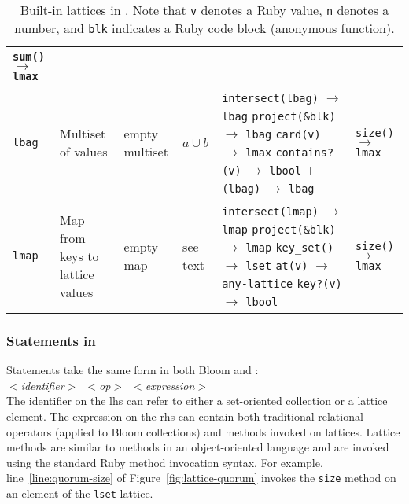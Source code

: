 \begin{table*}[t]
\begin{center}
\begin{tabular}{|l|p{0.88in}|l|l|p{1.44in}|p{1.00in}|}
\texttt{sum()} $\to$ \texttt{lmax} \\
\hline
\texttt{lbag} & Multiset of values & empty multiset & $a \cup b$ &
\texttt{intersect(lbag)} $\to$ \texttt{lbag}\newline
\texttt{project(\&blk)} $\to$ \texttt{lbag}\newline
\texttt{card(v)} $\to$ \texttt{lmax}\newline
\texttt{contains?(v)} $\to$ \texttt{lbool}\newline
\texttt{$\mathtt{+}$(lbag)} $\to$ \texttt{lbag}
& \texttt{size()} $\to$ \texttt{lmax}\\
\hline
\texttt{lmap} & Map from keys to \newline{}lattice values & empty map & see text&
\texttt{intersect(lmap)} $\to$ \texttt{lmap}\newline
\texttt{project(\&blk)} $\to$ \texttt{lmap}\newline
\texttt{key\_set()} $\to$ \texttt{lset}\newline
\texttt{at(v)} $\to$ \texttt{any-lattice}\newline
\texttt{key?(v)} $\to$ \texttt{lbool}
& \texttt{size()} $\to$ \texttt{lmax}\\
\hline
\end{tabular}
\caption{Built-in lattices in \lang. Note that \texttt{v} denotes a Ruby value,
  \texttt{n} denotes a number, and \texttt{blk} indicates a Ruby code block
  (anonymous function).}
\label{tbl:built-in-lattices}
\end{center}
\end{table*}


\subsubsection{Statements in \lang}
Statements take the same form in both Bloom and \lang: \\ \noindent
\mbox{\hspace{0.25in}\emph{$<$identifier$>$ $<$op$>$
    $<$expression$>$}}\\ \noindent
The identifier on the lhs can refer to either a set-oriented collection or a
lattice element. The expression on the rhs can contain both traditional
relational operators (applied to Bloom collections) and methods invoked on
lattices.  Lattice methods are similar to methods in an object-oriented language
and are invoked using the standard Ruby method invocation syntax. For example,
line~\ref{line:quorum-size} of Figure~\ref{fig:lattice-quorum} invokes the
\texttt{size} method on an element of the \texttt{lset} lattice.

